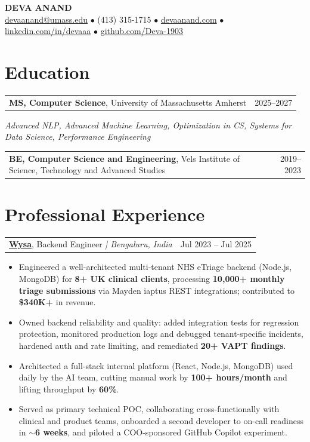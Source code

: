 \documentclass[letterpaper,11pt]{article}
\makeatletter
\newcommand{\eduItem}[3]{%
  \begin{tabular*}{\textwidth}{@{}l@{\extracolsep{\fill}}r@{}}
    \textbf{#1}, #2 & #3 \\
  \end{tabular*}\par
}
\newcommand{\expItem}[4]{%
  \vspace{3pt}
  \begin{tabular*}{\textwidth}{@{}l@{\extracolsep{\fill}}r@{}}
    \textbf{#1}, #2 \textit{| #3} & #4 \\
  \end{tabular*}\par\vspace{-2pt}
}
\makeatother
\begin{document}
\begin{center}
    {\fontsize{18}{20}\selectfont\bfseries DEVA ANAND}\\ \vspace{3pt}
    {\small
    \href{mailto:devaanand@umass.edu}{devaanand@umass.edu}
    \enspace$\bullet$\enspace
    (413) 315-1715
    \enspace$\bullet$\enspace
    \href{https://devaanand.com}{devaanand.com}
    \enspace$\bullet$\enspace
    \href{https://linkedin.com/in/devaaa/}{linkedin.com/in/devaaa}
    \enspace$\bullet$\enspace
    \href{https://github.com/Deva-1903}{github.com/Deva-1903}}
\end{center}
\vspace{-6pt}

\section{Education}
\eduItem{MS, Computer Science}{University of Massachusetts Amherst}{2025--2027}
{\small\textit{Advanced NLP, Advanced Machine Learning, Optimization in CS, Systems for Data Science, Performance Engineering}}\par
\vspace{3pt}
\eduItem{BE, Computer Science and Engineering}{Vels Institute of Science, Technology and Advanced Studies}{2019--2023}

\section{Professional Experience}

\expItem{\href{https://www.wysa.io}{Wysa}}{Backend Engineer}{Bengaluru, India}{Jul 2023 -- Jul 2025}
\begin{itemize}
  \item Engineered a well-architected multi-tenant NHS eTriage backend (Node.js, MongoDB) for \textbf{8+ UK clinical clients}, processing \textbf{10{,}000+ monthly triage submissions} via Mayden iaptus REST integrations; contributed to \textbf{\$340K+} in revenue.
  \item Owned backend reliability and quality: added integration tests for regression protection, monitored production logs and debugged tenant-specific incidents, hardened auth and rate limiting, and remediated \textbf{20+ VAPT findings}.
  \item Architected a full-stack internal platform (React, Node.js, MongoDB) used daily by the AI team, cutting manual work by \textbf{100+ hours/month} and lifting throughput by \textbf{60\%}.
  \item Served as primary technical POC, collaborating cross-functionally with clinical and product teams, onboarded a second developer to on-call readiness in \textbf{$\sim$6 weeks}, and piloted a COO-sponsored GitHub Copilot experiment.
\end{itemize}
\end{document}
